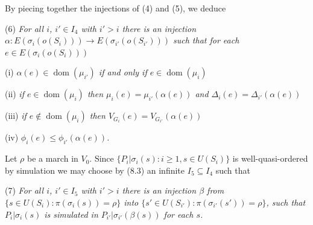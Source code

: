 By piecing together the injections of (4) and (5), we deduce

\hspace*{12pt}(6) \textit{For all $i$, $i' \in I_4$ with $i' > i$ there is an injection $\alpha \colon E(\sigma_i(o(S_i))) \to E(\sigma_{i'}(o(S_{i'})))$ such that for each $e \in E(\sigma_i(o(S_i)))$}

\hspace*{12pt}(i) \textit{$\alpha(e) \in \operatorname{dom}(\mu_{i'})$ if and only if $e \in \operatorname{dom}(\mu_i)$}

\hspace*{12pt}(ii) \textit{if $e \in \operatorname{dom}(\mu_i)$ then $\mu_i(e) = \mu_{i'}(\alpha(e))$ and $\Delta_i(e) = \Delta_{i'}(\alpha(e))$}

\hspace*{12pt}(iii) \textit{if $e \notin \operatorname{dom}(\mu_i)$ then $V_{G_i}(e) = V_{G_{i'}}(\alpha(e))$}

\hspace*{12pt}(iv) \textit{$\phi_i(e) \le \phi_{i'}(\alpha(e))$.}

Let $\rho$ be a march in $V_0$. Since $\{P_i | \sigma_i(s) \colon i \ge 1, s \in U(S_i)\}$ is well-quasi-ordered by simulation we may choose by (8.3) an infinite $I_5 \subseteq I_4$ such that

\hspace*{12pt}(7) \textit{For all $i$, $i' \in I_5$ with $i' > i$ there is an injection $\beta$ from $\{s \in U(S_i) \colon \pi(\sigma_i(s)) = \rho\}$ into $\{s' \in U(S_{i'}) \colon \pi(\sigma_{i'}(s')) = \rho\}$, such that $P_i | \sigma_i(s)$ is simulated in $P_{i'} | \sigma_{i'}(\beta(s))$ for each $s$.}
